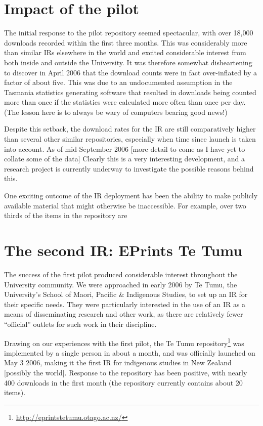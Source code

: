 \documentclass[12pt,pdftex,a4paper,titlepage]{article}
\begin{document}
\section{Impact of the pilot}

The initial response to the pilot repository seemed spectacular, with over 18,000 downloads recorded within the first three months. This was considerably more than similar IRs elsewhere in the world and excited considerable interest from both inside and outside the University. It was therefore somewhat disheartening to discover in April 2006 that the download counts were in fact over-inflated by a factor of about five. This was due to an undocumented assumption in the Tasmania statistics generating software \cite{Sale-A-2006-stats} that resulted in downloads being counted more than once if the statistics were calculated more often than once per day. (The lesson here is to always be wary of computers bearing good news!)

Despite this setback, the download rates for the IR are still comparatively higher than several other similar repositories, especially when time since launch is taken into account. As of mid-September 2006 [more detail to come as I have yet to collate some of the data] Clearly this is a very interesting development, and a research project is currently underway to investigate the possible reasons behind this.

One exciting outcome of the IR deployment has been the ability to make publicly available material that might otherwise be inaccessible. For example, over two thirds of the items in the repository are


\section{The second IR: EPrints Te Tumu}

The success of the first pilot produced considerable interest throughout the University community. We were approached in early 2006 by Te Tumu, the University's School of Maori, Pacific \& Indigenous Studies, to set up an IR for their specific needs. They were particularly interested in the use of an IR as a means of disseminating research and other work, as there are relatively fewer ``official'' outlets for such work in their discipline.

Drawing on our experiences with the first pilot, the Te Tumu repository\footnote{\url{http://eprintstetumu.otago.ac.nz/}} was implemented by a single person in about a month, and was officially launched on May 3 2006, making it the first IR for indigenous studies in New Zealand [possibly the world]. Response to the repository has been positive, with nearly 400 downloads in the first month (the repository currently contains about 20 items).
\end{document}

